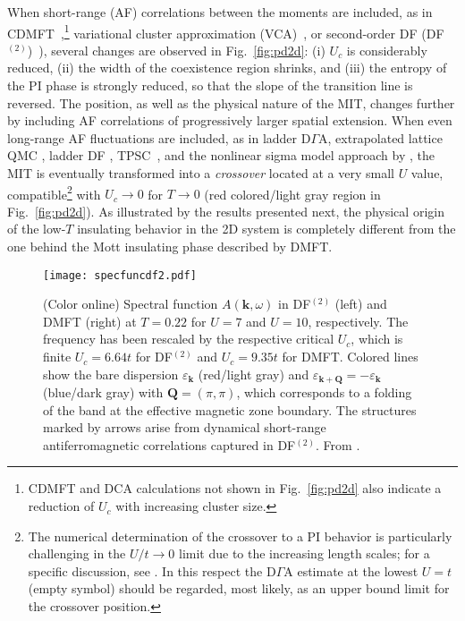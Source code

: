 \documentclass[rmp,aps,reprint,amsmath,amssymb,superscriptaddress,showpacs,nofootinbib]{revtex4-1}
\newcommand{\kv}{\ensuremath{\mathbf{k}}}
\newcommand{\QV}{\ensuremath{\mathbf{Q}}}
\begin{document}
When short-range (AF) correlations between the moments are included, as in CDMFT~\cite{Park2008},\footnote{CDMFT \cite{Fratino2017} and DCA calculations \cite{Moukouri2001,WernerPC13,Merino2014} not shown in Fig.~\ref{fig:pd2d} also indicate a reduction of $U_c$ with increasing cluster size.} variational cluster approximation (VCA)~\cite{Schaefer2015-2}, or second-order DF (DF$^{(2)}$)~), several changes are observed in Fig.~\ref{fig:pd2d}: (i)  $U_c$ is considerably reduced, (ii) the width of the coexistence region shrinks, and (iii) the entropy of the PI phase is strongly reduced, so that the slope of the transition line  is reversed. The position, as well as  the physical nature of the MIT, changes further by including AF correlations of progressively larger spatial extension. When even long-range AF fluctuations  are included, as in ladder D$\Gamma$A, extrapolated lattice QMC \cite{Schaefer2015-2}, ladder DF \cite{vanLoon2017}, TPSC~\cite{Vilk1996,Vilk1997}, and the nonlinear sigma model approach by , the MIT is eventually transformed into a {\sl crossover} located at a very small $U$ value, compatible\footnote{The numerical determination of the crossover to a PI behavior is particularly challenging in the $U/t \rightarrow 0$ limit due to the  increasing length scales; for a specific discussion, see . In this respect the D$\Gamma$A estimate at the lowest $U=t$ (empty symbol) should be regarded, most likely, as an upper bound limit for the crossover position.} with $U_c \rightarrow 0$ for $T\rightarrow 0$  (red colored/light gray region in Fig.~\ref{fig:pd2d}). As illustrated by the results presented next, the physical origin of the  low-$T$ insulating behavior in the 2D system is completely different from the one behind the Mott insulating phase described by DMFT.

\begin{figure}[t]
  \texttt{[image: specfuncdf2.pdf]} 
    \caption{(Color online) Spectral function $A(\kv,\omega)$ in DF$^{(2)}$ (left) and DMFT (right) at $T=0.22$ for $U=7$ and  $U=10$, respectively. The frequency has been rescaled by the respective critical $U_c$, which is finite $U_{c}=6.64t$ for DF$^{(2)}$ and $U_{c}=9.35t$ for DMFT. Colored lines show the bare dispersion $\varepsilon_{\kv}$ (red/light gray) and $\varepsilon_{\kv+\QV}=-\varepsilon_{\kv}$ (blue/dark gray) with $\QV=(\pi,\pi)$, which corresponds to a folding of the band at the effective magnetic zone boundary. The structures marked by arrows arise from dynamical short-range antiferromagnetic correlations captured in DF$^{(2)}$. From .}
\label{fig:df2dspec}
\end{figure}
\end{document}
